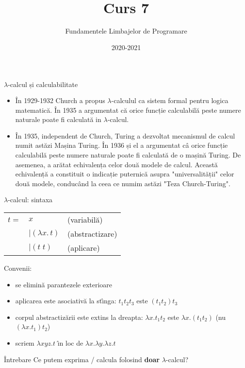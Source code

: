 \documentclass[xcolor=pdftex,romanian,colorlinks]{beamer}
\begin{document}
\title{\\Curs 7}
\author{Fundamentele Limbajelor de Programare} 
\date{2020-2021} 

\frame{\titlepage} 

 


\begin{frame}{$\lambda$-calcul și calculabilitate}

  \begin{itemize}
  \item În 1929-1932 Church a propus 
  $\lambda$-calculul ca sistem formal pentru logica matematică.
  În 1935 a argumentat că orice funcție calculabilă peste numere naturale poate
  fi calculată in $\lambda$-calcul.
  
  \item În 1935, independent de Church, Turing a dezvoltat mecanismul de calcul
  numit astăzi Mașina Turing. 
  În 1936 și el a argumentat câ orice funcție calculabilă peste numere naturale poate
  fi calculată de o mașină Turing.
  De asemenea, a arătat echivalența celor două modele de calcul.
  Această echivalență a constituit o indicație puternică asupra "universalității" 
  celor două modele, conducând la ceea ce numim astăzi "Teza Church-Turing".
  \end{itemize}
\end{frame}


\begin{frame}[fragile]{ $\lambda$-calcul: sintaxa}

  \begin{center}
   \begin{tabular}{lll}
  $t=$ &  $x$ &  (variabilă) \\
   & $\mid (\lambda x.\, t)$ & (abstractizare)\\
    & $\mid (t\; t)$ & (aplicare)
  \end{tabular}
  \end{center}

Conven\ts ii:

\begin{itemize}
\item se elimin\u a parantezele exterioare
\item aplicarea este asociativ\u a la st\^{\i}nga: $t_1t_2t_3$ este $(t_1t_2)t_3$
\item corpul abstractiz\u arii este extins la dreapta: $\lambda x.t_1t_2$ este $\lambda x.(t_1t_2)$ (nu $(\lambda x.t_1)t_2$)
\item scriem $\lambda xyz.t$ \^{\i}n loc de $\lambda x.\lambda y.\lambda z.t$
\end{itemize}

\pause

\begin{block}{Întrebare}
  Ce putem exprima / calcula folosind {\bf doar} $\lambda$-calcul?
\end{block}

\end{frame}  
\end{document}
